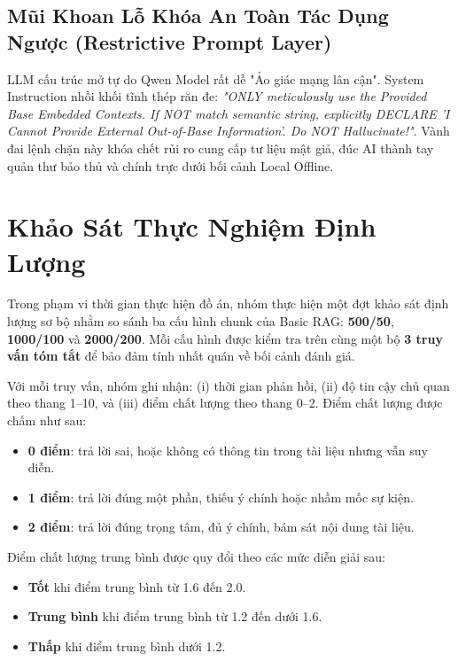 \documentclass[10pt, conference, a4paper, compsocconf]{IEEEtran}
\begin{document}
\subsection{Mũi Khoan Lỗ Khóa An Toàn Tác Dụng Ngược (Restrictive Prompt Layer)}
LLM cấu trúc mở tự do Qwen Model rất dễ "Ảo giác mạng lân cận". System Instruction nhồi khối tĩnh thép răn đe: \textit{"ONLY meticulously use the Provided Base Embedded Contexts. If NOT match semantic string, explicitly DECLARE 'I Cannot Provide External Out-of-Base Information'. Do NOT Hallucinate!"}. Vành đai lệnh chặn này khóa chết rủi ro cung cấp tư liệu mật giả, đúc AI thành tay quản thư bảo thủ và chính trực dưới bối cảnh Local Offline.

\section{Khảo Sát Thực Nghiệm Định Lượng}

Trong phạm vi thời gian thực hiện đồ án, nhóm thực hiện một đợt khảo sát định lượng sơ bộ nhằm so sánh ba cấu hình chunk của Basic RAG: \textbf{500/50}, \textbf{1000/100} và \textbf{2000/200}. Mỗi cấu hình được kiểm tra trên cùng một bộ \textbf{3 truy vấn tóm tắt}  để bảo đảm tính nhất quán về bối cảnh đánh giá.

Với mỗi truy vấn, nhóm ghi nhận: (i) thời gian phản hồi, (ii) độ tin cậy chủ quan theo thang 1--10, và (iii) điểm chất lượng theo thang 0--2. Điểm chất lượng được chấm như sau:
\begin{itemize}
\item \textbf{0 điểm}: trả lời sai, hoặc không có thông tin trong tài liệu nhưng vẫn suy diễn.
\item \textbf{1 điểm}: trả lời đúng một phần, thiếu ý chính hoặc nhầm mốc sự kiện.
\item \textbf{2 điểm}: trả lời đúng trọng tâm, đủ ý chính, bám sát nội dung tài liệu.
\end{itemize}

Điểm chất lượng trung bình được quy đổi theo các mức diễn giải sau:
\begin{itemize}
\item \textbf{Tốt} khi điểm trung bình từ 1.6 đến 2.0.
\item \textbf{Trung bình} khi điểm trung bình từ 1.2 đến dưới 1.6.
\item \textbf{Thấp} khi điểm trung bình dưới 1.2.
\end{itemize}
\end{document}
